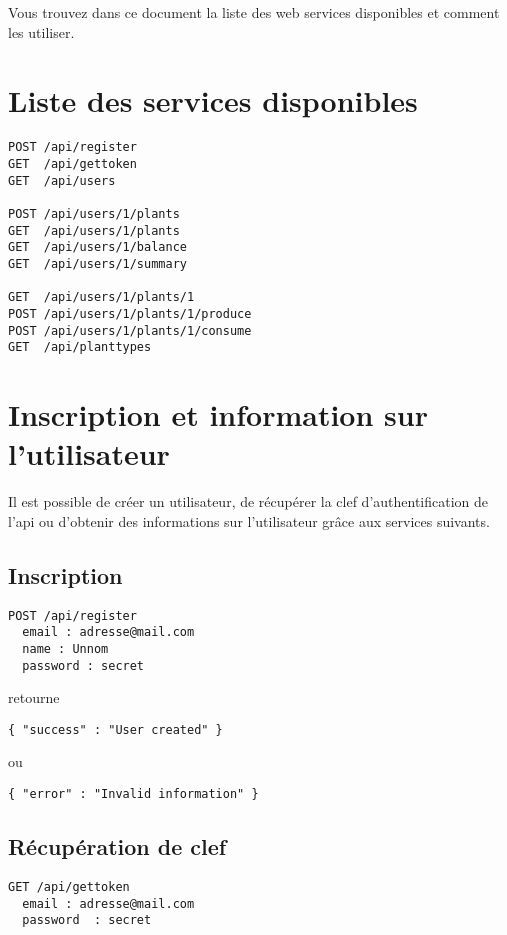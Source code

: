 
Vous trouvez dans ce document la liste des web services disponibles et comment les utiliser.

\section{Liste des services disponibles}

\begin{lstlisting}
POST /api/register
GET  /api/gettoken 
GET  /api/users

POST /api/users/1/plants
GET  /api/users/1/plants
GET  /api/users/1/balance
GET  /api/users/1/summary

GET  /api/users/1/plants/1
POST /api/users/1/plants/1/produce
POST /api/users/1/plants/1/consume
GET  /api/planttypes
\end{lstlisting}


\section{Inscription et information sur l'utilisateur}
Il est possible de créer un utilisateur, de récupérer la clef d'authentification de l'api
ou d'obtenir des informations sur l'utilisateur grâce aux services suivants.

\subsection{Inscription}

\begin{lstlisting}
POST /api/register 
  email : adresse@mail.com
  name : Unnom
  password : secret
\end{lstlisting}

retourne

\begin{lstlisting}
{ "success" : "User created" }
\end{lstlisting}
 
ou 

\begin{lstlisting}
{ "error" : "Invalid information" }
\end{lstlisting}

\subsection{Récupération de clef}

\begin{lstlisting}
GET /api/gettoken 
  email : adresse@mail.com
  password  : secret
\end{lstlisting}

